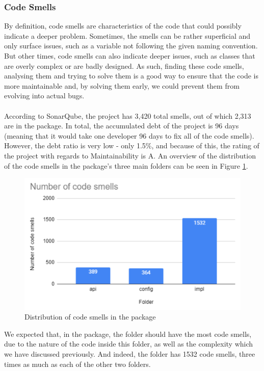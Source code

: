         \subsubsection{Code Smells}
            By definition, code smells are characteristics of the code that could possibly indicate a deeper problem. Sometimes, the smells can be rather superficial and only surface issues, such as a variable not following the given naming convention. But other times, code smells can also indicate deeper issues, such as classes that are overly complex or are badly designed. As such, finding these code smells, analysing them and trying to solve them is a good way to ensure that the code is more maintainable and, by solving them early, we could prevent them from evolving into actual bugs. 
            \\ \\
            According to SonarQube, the project has 3,420 total smells, out of which 2,313 are in the  package. In total, the accumulated debt of the project is 96 days (meaning that it would take one developer 96 days to fix all of the code smells). However, the debt ratio is very low - only 1.5\%, and because of this, the rating of the project with regards to Maintainability is A. An overview of the distribution of the code smells in the  package's three main folders can be seen in Figure \ref{fig:numberofcodesmells}.
            \begin{figure}[H]
                \centering
                \includegraphics{figures/step4/step4.2/numberofcodesmells.PNG}
                \caption{Distribution of code smells in the  package}
                \label{fig:numberofcodesmells}
            \end{figure}
            We expected that, in the  package, the  folder should have the most code smells, due to the nature of the code inside this folder, as well as the complexity which we have discussed previously. And indeed, the folder has 1532 code smells, three times as much as each of the other two folders. 
